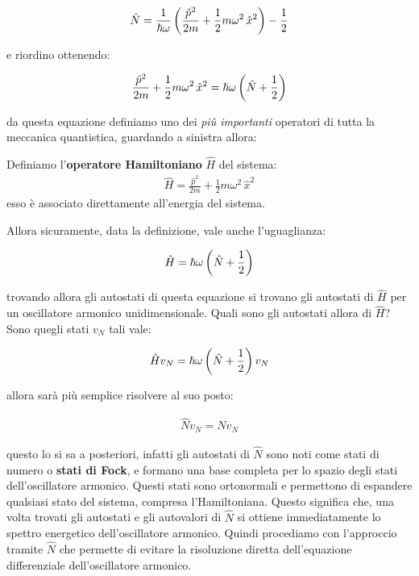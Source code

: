 \begin{align*}
	\hat{N} = \frac{1}{\hbar \omega} \, \qty(\frac{\hat{p}^2}{2m} + \frac{1}{2}m\omega^2 \, \hat{x}^2) - \frac{1}{2}  
\end{align*}
		
	e riordino ottenendo:

\begin{nb}
\begin{align*}
	\frac{\hat{p}^2}{2m} + \frac{1}{2}m\omega^2 \, \hat{x}^2 = \hbar \omega \, \qty(\hat{N} + \frac{1}{2})
\end{align*}
\end{nb}
	
	da questa equazione definiamo uno dei \textit{più importanti} operatori di tutta la meccanica quantistica, guardando a sinistra allora:

\begin{mydef}
	Definiamo l'\textbf{operatore Hamiltoniano} $\hat{H}$ del sistema:
\begin{align*}
	\hat{H} = \frac{\hat{p}^2}{2m} + \frac{1}{2}m\omega^2 \, \hat{x}^2
\end{align*}
	esso è associato direttamente all'energia del sistema.
\end{mydef}
	
	Allora sicuramente, data la definizione, vale anche l'uguaglianza:
	
\begin{align*}
	\hat{H} = \hbar \omega \, \qty(\hat{N} + \frac{1}{2})
\end{align*}

	trovando allora gli autostati di questa equazione si trovano gli autostati di $\hat{H}$ per un oscillatore armonico unidimensionale. Quali sono gli autostati allora di $\hat{H}$? Sono quegli stati $v_N$ tali vale:
	
\begin{align*}
	\hat{H}v_N = \hbar \omega \, \qty(\hat{N} + \frac{1}{2}) \, v_N
\end{align*}

	allora sarà più semplice risolvere al suo posto:
	
\begin{align*}
	\hat{N} v_{N} = N v_N
\end{align*}
	
	questo lo si sa a posteriori, infatti gli autostati di $\hat{N}$ sono noti come stati di numero o \textbf{stati di Fock}, e formano una base completa per lo spazio degli stati dell'oscillatore armonico. Questi stati sono ortonormali e permettono di espandere qualsiasi stato del sistema, compresa l'Hamiltoniana. Questo significa che, una volta trovati gli autostati e gli autovalori di $\hat{N}$ si ottiene immediatamente lo spettro energetico dell'oscillatore armonico. Quindi procediamo con l'approccio tramite $\hat{N}$ che permette di evitare la risoluzione diretta dell'equazione differenziale dell'oscillatore armonico.

